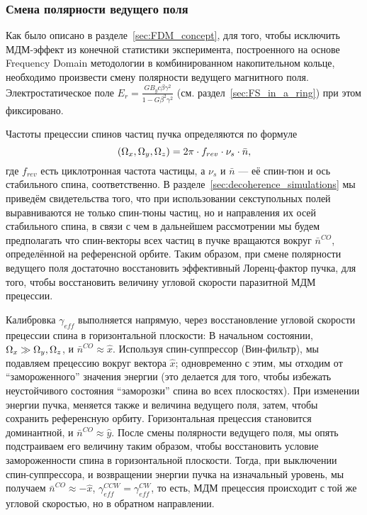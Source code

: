 \subsubsection{Смена полярности ведущего поля}\label{sec:field_flipping-theory}
Как было описано в разделе~\ref{sec:FDM_concept}, для того, чтобы исключить МДМ-эффект из конечной статистики эксперимента, построенного на основе Frequency Domain методологии в комбинированном накопительном кольце, необходимо произвести смену полярности ведущего магнитного поля. Электростатическое поле $E_r = \frac{GB_yc\beta\gamma^2}{1-G\beta^2\gamma^2}$ (см. раздел~\ref{sec:FS_in_a_ring}) при этом фиксировано.

Частоты прецессии спинов частиц пучка определяются по формуле~\cite[стр.~4]{COSY:SpinTuneMapping}
\[
(\Omega_x, \Omega_y, \Omega_z) = 2\pi\cdot f_{rev} \cdot \nu_s \cdot \bar n,
\]
где $f_{rev}$ есть циклотронная частота частицы, а $\nu_s$ и $\bar n$ --- её спин-тюн и ось стабильного спина, соответственно. В разделе~\ref{sec:decoherence_simulations} мы приведём свидетельства того, что при использовании секступольных полей выравниваются не только спин-тюны частиц, но и направления их осей стабильного спина, в связи с чем в дальнейшем рассмотрении мы будем предполагать что спин-векторы всех частиц в пучке вращаются вокруг $\bar n^{CO}$, определённой на референсной орбите. Таким образом, при смене полярности ведущего поля достаточно восстановить эффективный Лоренц-фактор пучка, для того, чтобы восстановить величину угловой скорости паразитной МДМ прецессии.

Калибровка $\gamma_{eff}$ выполняется напрямую, через восстановление угловой скорости прецессии спина в горизонтальной плоскости:
В начальном состоянии, $\Omega_x\gg \Omega_y, \Omega_z$, и $\bar n^{CO}\approx \hat x$. Используя спин-суппрессор (Вин-фильтр), мы подавляем прецессию вокруг вектора $\hat x$; одновременно с этим, мы отходим от ``замороженного'' значения энергии (это делается для того, чтобы избежать неустойчивого состояния ``заморозки'' спина во всех плоскостях). При изменении энергии пучка, меняется также и величина ведущего поля, затем, чтобы сохранить референсную орбиту. Горизонтальная прецессия становится доминантной, и $\bar n^{CO} \approx \hat y$. После смены полярности ведущего поля, мы опять подстраиваем его величину таким образом, чтобы восстановить условие замороженности спина в горизонтальной плоскости. Тогда, при выключении спин-суппрессора, и возвращении энергии пучка на изначальный уровень, мы получаем $\bar n^{CO} \approx -\hat x$, $\gamma_{eff}^{CCW} = \gamma_{eff}^{CW}$, то есть, МДМ прецессия происходит с той же угловой скоростью, но в обратном направлении. 

